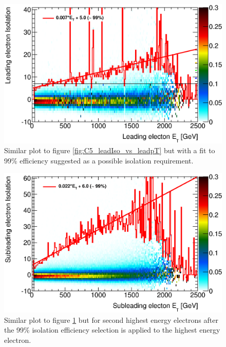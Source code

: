    \begin{figure}[h]
      \begin{center}
      \includegraphics[scale=0.7]{images/C5_leadIso_vs_leadpT_proposal.eps}
      \end{center}
   \caption{Similar plot to figure \ref{fig:C5_leadIso_vs_leadpT} but with a fit to 99\% efficiency suggested as a possible isolation requirement.}
   \label{fig:C5_leadIso_vs_leadpT_proposal}
   \end{figure}


   \begin{figure}[h]
      \begin{center}
      \includegraphics[scale=0.7]{images/C5_subIso_vs_subpT_proposal.eps}
      \end{center}
   \caption{Similar plot to figure \ref{fig:C5_leadIso_vs_leadpT_proposal} but for second highest energy electrons after the 99\% isolation efficiency selection is applied to the highest energy electron.}
   \label{fig:C5_subIso_vs_subpT_proposal}
   \end{figure}



